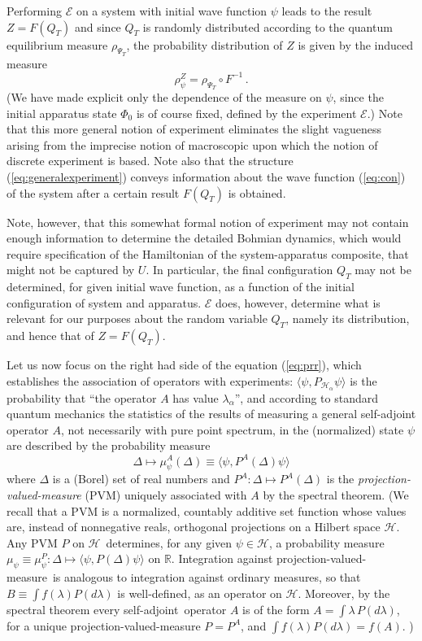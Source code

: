 \documentclass[12pt]{article}
\newcommand{\eq}[1]{(\ref{#1})}
\newcommand{\sa}{self-adjoint}
\newcommand{\wf}{wave function}
\newcommand{\PV}{projection-valued-measure}
\renewcommand{\a}{\alpha}
\newcommand{\la}{\lambda_{\a}}
\renewcommand{\H}{\mbox{$\mathcal{H}$}}
\newcommand{\Pa}{ P_{ {\mathcal{H}_{\a} } } }
\newcommand{\R}{\mathbb{R}}
\newcommand{\E}{\mbox{$\mathscr{E}$}}
\begin{document}
Performing \E{} on a system with initial \wf{} $\psi$ leads to the
result ${Z}= F(Q_T)$ and since $Q_{T}$ is randomly distributed
according to the quantum equilibrium measure $\rho_{\Psi_T}$, the
probability distribution of $Z$ is given by the induced measure
\begin{equation}
\rho^{ Z}_{\psi}= \rho_{\Psi_T}\circ
F^{-1}\,.
\label{eq:indumas}
\end{equation}
(We have made explicit only the dependence of the measure on $\psi$,
since the initial apparatus state $\Phi_{0}$ is of course fixed,
defined by the experiment \E{}.)  Note that this more general notion
of experiment eliminates the slight vagueness arising {}from the
imprecise notion of macroscopic upon which the notion of discrete
experiment is based.  Note also that the structure
\eq{eq:generalexperiment} conveys information about the wave function
\eq{eq:con} of the system after a certain result $F(Q_T)$ is obtained.

Note, however, that this somewhat formal notion of experiment may not
contain enough information to determine the detailed Bohmian dynamics,
which would require specification of the Hamiltonian of the
system-apparatus composite, that might not be captured by $U$. In
particular, the final configuration $Q_T$ may not be determined, for
given initial \wf{}, as a function of the initial configuration of
system and apparatus. \E{} does, however, determine what is relevant
for our purposes about the random variable $Q_T$, namely its
distribution, and hence that of $Z=F(Q_T)$.

Let us now focus on the right had side of the equation (\ref{eq:prr}),
which establishes the association of operators with experiments:
$\langle\psi,\Pa \psi \rangle$ is the probability that ``the operator
$A $ has value $\la$'', and according to standard quantum mechanics
the statistics of the results of measuring a general \sa{} operator
$A$, not necessarily with pure point spectrum, in the (normalized)
state $\psi$ are described by the probability measure
\begin{equation}
   \Delta\mapsto\mu^{A}_\psi(\Delta) \equiv \langle \psi,
P^{A }(\Delta) \psi \rangle
\label{eq:spectrmeas}
\end{equation}
where $\Delta$ is a (Borel) set of real numbers and $P^A:
\Delta\mapsto P^{A }(\Delta)$ is the \emph{projection-valued-measure}
(PVM) uniquely associated with $A$ by the spectral theorem.  (We
recall \cite{RS80} that a PVM is a normalized, countably additive set
function whose values are, instead of nonnegative reals, orthogonal
projections on a Hilbert space \H{}.  Any PVM $P$ on \H\ determines,
for any given $\psi\in \H$, a probability measure
$\mu_\psi\equiv\mu_\psi^P : \Delta \mapsto \langle\psi ,
P(\Delta)\psi\rangle$ on $\R$.  Integration against \PV\ is analogous
to integration against ordinary measures, so that $B\equiv \int
f(\lambda) P(d\lambda) $ is well-defined, as an operator on $\H$.
Moreover, by the spectral theorem every \sa\ operator $A$ is of the
form $ A= \int \lambda\, P(d\lambda)$, for a unique \PV{} $ P =P^{A}$,
and $\int f(\lambda) P(d\lambda)= f(A)$. )
\end{document}
